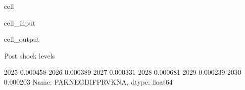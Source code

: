 \documentclass[letterpaper,10pt,english]{jupyterBook}
\begin{document}
\begin{sphinxuseclass}{cell}\begin{sphinxVerbatimInput}

\begin{sphinxuseclass}{cell_input}
\begin{sphinxVerbatim}[commandchars=\\\{\}]

\PYG{p}{[}\PYG{p}{]}
\end{sphinxVerbatim}

\end{sphinxuseclass}\end{sphinxVerbatimInput}
\begin{sphinxVerbatimOutput}

\begin{sphinxuseclass}{cell_output}
\begin{sphinxVerbatim}[commandchars=\\\{\}]
Post shock levels
\end{sphinxVerbatim}

\begin{sphinxVerbatim}[commandchars=\\\{\}]
2025   \PYGZhy{}0.000458
2026   \PYGZhy{}0.000389
2027   \PYGZhy{}0.000331
2028    0.000681
2029   \PYGZhy{}0.000239
2030   \PYGZhy{}0.000203
Name: PAKNEGDIFPRVKN\PYGZus{}A, dtype: float64
\end{sphinxVerbatim}

\end{sphinxuseclass}\end{sphinxVerbatimOutput}

\end{sphinxuseclass}
\end{document}
